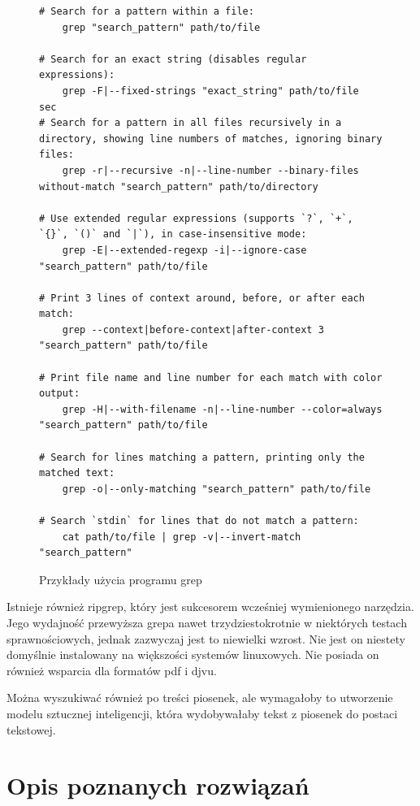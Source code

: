 \begin{figure}[h]
  \centering
  \begin{lstlisting}
# Search for a pattern within a file:
    grep "search_pattern" path/to/file

# Search for an exact string (disables regular expressions):
    grep -F|--fixed-strings "exact_string" path/to/file
sec
# Search for a pattern in all files recursively in a directory, showing line numbers of matches, ignoring binary files:
    grep -r|--recursive -n|--line-number --binary-files without-match "search_pattern" path/to/directory

# Use extended regular expressions (supports `?`, `+`, `{}`, `()` and `|`), in case-insensitive mode:
    grep -E|--extended-regexp -i|--ignore-case "search_pattern" path/to/file

# Print 3 lines of context around, before, or after each match:
    grep --context|before-context|after-context 3 "search_pattern" path/to/file

# Print file name and line number for each match with color output:
    grep -H|--with-filename -n|--line-number --color=always "search_pattern" path/to/file

# Search for lines matching a pattern, printing only the matched text:
    grep -o|--only-matching "search_pattern" path/to/file

# Search `stdin` for lines that do not match a pattern:
    cat path/to/file | grep -v|--invert-match "search_pattern"
  \end{lstlisting}
  \caption{Przykłady użycia programu grep}
  \label{fig:code:bashGrepExamples}
\end{figure}

Istnieje również ripgrep, który jest sukcesorem wcześniej wymienionego
narzędzia. Jego wydajność przewyższa grepa nawet trzydziestokrotnie w niektórych
testach sprawnościowych, jednak zazwyczaj jest to niewielki wzrost. Nie jest on
niestety domyślnie instalowany na większości systemów linuxowych. Nie posiada on
również wsparcia dla formatów pdf i djvu.

Można wyszukiwać również po treści piosenek, ale wymagałoby to utworzenie modelu
sztucznej inteligencji, która wydobywałaby tekst z piosenek do postaci tekstowej.

\section{Opis poznanych rozwiązań}
